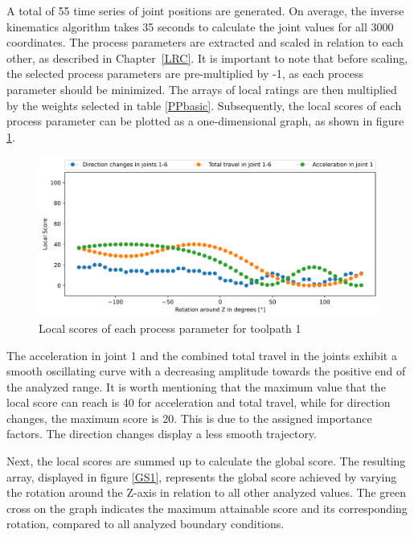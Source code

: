 A total of 55 time series of joint positions are generated. On average, the inverse kinematics algorithm takes 35 seconds to calculate the joint values for all 3000 coordinates. The process parameters are extracted and scaled in relation to each other, as described in Chapter~\ref{LRC}. It is important to note that before scaling, the selected process parameters are pre-multiplied by -1, as each process parameter should be minimized. The arrays of local ratings are then multiplied by the weights selected in table \ref{PPbasic}. Subsequently, the local scores of each process parameter can be plotted as a one-dimensional graph, as shown in figure \ref{LS1}. %

\begin{figure}[H]
	\centerline{\includegraphics[width=1\textwidth]{figures/LocalScores_1.png}}
	\caption{Local scores of each process parameter for toolpath 1}
	\label{LS1}
\end{figure}

The acceleration in joint 1 and the combined total travel in the joints exhibit a smooth oscillating curve with a decreasing amplitude towards the positive end of the analyzed range. It is worth mentioning that the maximum value that the local score can reach is 40 for acceleration and total travel, while for direction changes, the maximum score is 20. This is due to the assigned importance factors. The direction changes display a less smooth trajectory.

Next, the local scores are summed up to calculate the global score. The resulting array, displayed in figure \ref{GS1}, represents the global score achieved by varying the rotation around the Z-axis in relation to all other analyzed values. The green cross on the graph indicates the maximum attainable score and its corresponding rotation, compared to all analyzed boundary conditions.


